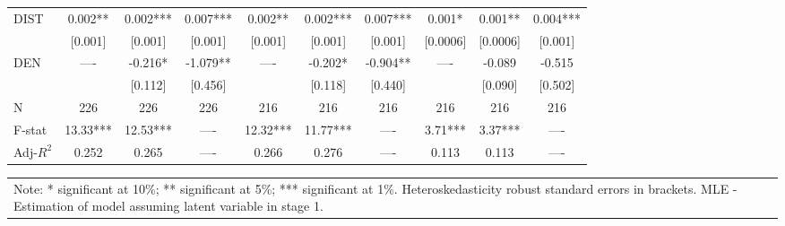 \documentclass[12pt]{article}
\begin{document}
\begin{sidewaystable}
\begin{tabular}{l|c c c c c c c c c}
DIST & 0.002** & 0.002*** & 0.007*** & 0.002** & 0.002*** & 0.007*** & 0.001* &  0.001** & 0.004***\\
& [0.001] & [0.001] & [0.001] & [0.001] & [0.001] & [0.001] & [0.0006] & [0.0006] & [0.001]\\
DEN & ---- & -0.216* & -1.079** & ---- & -0.202* & -0.904** & ---- & -0.089 & -0.515\\
& & [0.112] & [0.456] &  & [0.118] & [0.440] &  & [0.090] & [0.502]\\
\hline
N & 226 & 226 & 226 & 216 & 216 & 216 & 216 & 216 & 216\\
F-stat & 13.33*** & 12.53*** & ---- & 12.32*** & 11.77*** & ---- & 3.71*** & 3.37*** & ----\\
Adj-$R^2$ & 0.252 & 0.265 & ---- & 0.266 & 0.276 & ---- & 0.113 & 0.113 & ----\\
\hline
\hline
\end{tabular}
\footnotesize{\begin{tabular}{p{8.5in}}
Note: * significant at 10\%; ** significant at 5\%; *** significant at 1\%. Heteroskedasticity robust standard errors in brackets. MLE - Estimation of model assuming latent variable in stage 1.
\end{tabular}}
\end{sidewaystable}
\end{document}
